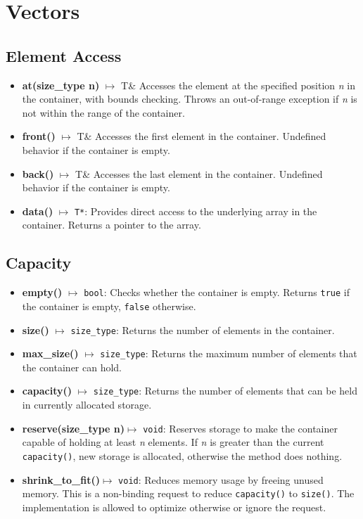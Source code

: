 \documentclass{report}
\begin{document}
    

    \pagebreak \bigbreak \noindent 
    \section{\LARGE Vectors}
    \bigbreak \noindent 
    \subsection{Element Access}
    \begin{itemize}
        \item \textbf{at(size\_type n)} \(\mapsto\) T\& Accesses the element at the specified position \textit{n} in the container, with bounds checking. Throws an out-of-range exception if \textit{n} is not within the range of the container.
        \item \textbf{front()} \(\mapsto\) T\& Accesses the first element in the container. Undefined behavior if the container is empty.
        \item \textbf{back()} \(\mapsto\) T\& Accesses the last element in the container. Undefined behavior if the container is empty.
        \item \textbf{data()} \(\mapsto\) \texttt{\texttt{T*}}: Provides direct access to the underlying array in the container. Returns a pointer to the array.
    \end{itemize}

    \bigbreak \noindent 
    \subsection{Capacity}
    \begin{itemize}
        \item \textbf{empty()} \(\mapsto\) \texttt{bool}: Checks whether the container is empty. Returns \texttt{true} if the container is empty, \texttt{false} otherwise.
        \item \textbf{size()} \(\mapsto\) \texttt{size\_type}: Returns the number of elements in the container.
        \item \textbf{max\_size()} \(\mapsto\) \texttt{size\_type}: Returns the maximum number of elements that the container can hold.
        \item \textbf{capacity()} \(\mapsto\) \texttt{size\_type}: Returns the number of elements that can be held in currently allocated storage.
        \item \textbf{reserve(size\_type n)}$\mapsto$ \texttt{void}: Reserves storage to make the container capable of holding at least \textit{n} elements. If \textit{n} is greater than the current \texttt{capacity()}, new storage is allocated, otherwise the method does nothing.
        \item \textbf{shrink\_to\_fit()}$\mapsto$ \texttt{void}: Reduces memory usage by freeing unused memory. This is a non-binding request to reduce \texttt{capacity()} to \texttt{size()}. The implementation is allowed to optimize otherwise or ignore the request.
    \end{itemize}
\end{document}
